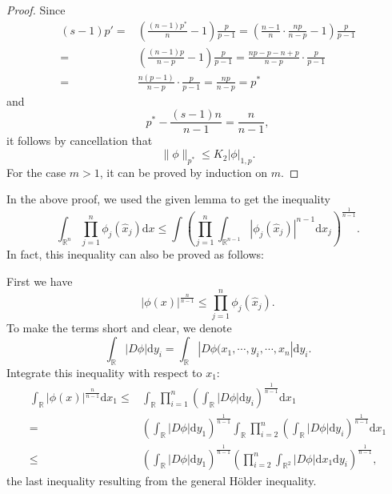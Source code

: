 \begin{proof}
  Since
  \begin{align*}
    (s-1)p'=&\left(\frac{(n-1)p^{\ast}}{n}-1\right) \frac{p}{p-1}=\left( \frac{n-1}{n}\cdot \frac{np}{n-p}-1 \right) \frac{p}{p-1}\\
    =& \left( \frac{(n-1)p}{n-p}-1 \right) \frac{p}{p-1}=\frac{np-p-n+p}{n-p}\cdot \frac{p}{p-1}\\
    =& \frac{n(p-1)}{n-p}\cdot \frac{p}{p-1}=\frac{np}{n-p}=p^{\ast}
  \end{align*}
  and
 \[
   p^{\ast}-\frac{(s-1)n}{n-1}=\frac{n}{n-1},
 \] 
  it follows by cancellation that 
  \[
  \|\phi\|_{p^{\ast}}\le K_2 \left| \phi \right| _{1,p}.
  \] 
For the case $m>1$, it can be proved by induction on  $m$.
\end{proof}

In the above proof, we used the  given lemma to get the inequality 
\[
  \int_{\mathbb{R}^{n}}\prod_{j=1}^{n}\phi_{j}(\hat{x}_j)\mathrm{d}x\le \int \left( \prod_{j=1}^{n}\int_{\mathbb{R}^{n-1}}\left| \phi_j(\hat{x}_j) \right| ^{n-1}\mathrm{d}\hat{x}_j \right) ^{\frac{1}{n-1}}.
\] 
In fact, this inequality can also be proved as follows:

First we have 
\[
  \left| \phi(x) \right| ^{\frac{n}{n-1}}\le \prod_{j=1}^{n}\phi_j(\hat{x}_j).
\]
To make the terms short and clear, we denote
\[
  \int_{\mathbb{R}}\left| D\phi \right| \mathrm{d}y_i=\int_{\mathbb{R}}\left| D\phi(x_1,\cdots,y_i,\cdots,x_n \right| \mathrm{d}y_i.
\] 
Integrate this inequality with respect to $x_1$:
\begin{align*}
  \int_{\mathbb{R}}\left| \phi(x) \right| ^{\frac{n}{n-1}}\mathrm{d}x_1\le & \int_{\mathbb{R}}\prod_{i=1}^{n}\left( \int_{\mathbb{R}}\left| D \phi \right| \mathrm{d}y_{i} \right)^{\frac{1}{n-1}}\mathrm{d}x_1\\
  =& \left( \int_{\mathbb{R}}\left| D \phi \right|\mathrm{d}y_1  \right)^{\frac{1}{n-1}}\int_{\mathbb{R}}\prod_{i=2}^{n}\left( \int_{\mathbb{R}}\left| D\phi \right|\mathrm{d}y_i  \right) ^{\frac{1}{n-1}}\mathrm{d}x_1 \\
  \le& \left( \int_{\mathbb{R}}\left| D\phi \right| \mathrm{d}y_1 \right) ^{\frac{1}{n-1}}\left( \prod_{i=2}^{n}\int_{\mathbb{R}^{2}}\left| D\phi \right| \mathrm{d}x_1\mathrm{d}y_i \right)^{\frac{1}{n-1}}, 
\end{align*}
the last inequality resulting from the general H\"{o}lder inequality.

